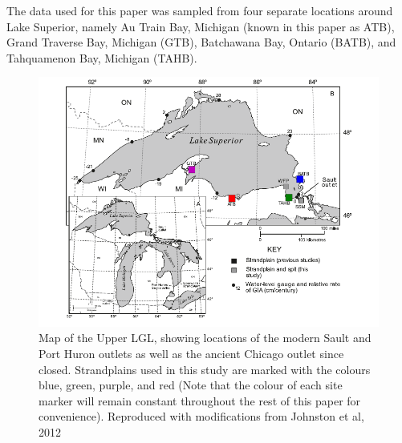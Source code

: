 \documentclass{article}
\begin{document}
\newpage 
 
 The data used for this paper was sampled from four separate locations around
  Lake Superior, namely
 Au Train Bay, Michigan (known in this paper as ATB), Grand Traverse Bay,
 Michigan (GTB), Batchawana Bay, Ontario (BATB), and 
 Tahquamenon Bay, Michigan (TAHB).\\
 \begin{figure}[h]
	\includegraphics[width=0.8\linewidth]{johnstonLaurentianMapWithSites.png}
	\caption{Map of the Upper LGL, showing locations of the modern Sault and Port Huron
	outlets as well as the ancient Chicago outlet since closed. Strandplains used
	in this study are marked with the colours blue, green, purple, and red (Note that
	 the colour of each site marker will remain constant throughout the rest of
	 this paper for convenience). Reproduced with modifications from Johnston et al, 2012}
	\label{fig:johnstonLaurentianMapWithSites}
 \end{figure}
\end{document}
